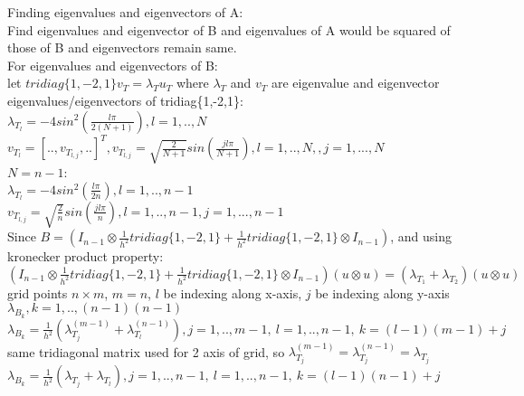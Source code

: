\documentclass[12pt,letter]{article}
\begin{document}
\begin{enumerate}
\begin{enumerate}
    \pagebreak
    
    Finding eigenvalues and eigenvectors of A:\\

    Find eigenvalues and eigenvector of B and eigenvalues of A would be squared of those of B and eigenvectors remain same.\\

    For eigenvalues and eigenvectors of B:\\
    
    let $tridiag\{1,-2,1\} v_T=\lambda_{T} u_T$ where $\lambda_T$ and $v_T$ are eigenvalue and eigenvector\\

    eigenvalues/eigenvectors of tridiag\{1,-2,1\}:\\
    $\lambda_{T_l}=-4sin^2(\frac{l \pi}{2(N+1)}), l=1,..,N$\\
    $v_{T_{l}} = [.., v_{T_{l,j}}, ..]^T, v_{T_{l,j}}=\sqrt{\frac{2}{N+1}}sin(\frac{jl \pi}{N+1}),l=1,..,N,, j=1,...,N$\\

    $N=n-1$:\\
    $\lambda_{T_l}=-4sin^2(\frac{l \pi}{2n}), l=1,..,n-1$\\
    $v_{T_{l,j}}=\sqrt{\frac{2}{n}}sin(\frac{jl \pi}{n}), l=1,..,n-1, j=1,...,n-1$\\
    
    Since $B=(I_{n-1} \otimes \frac{1}{h^2}tridiag\{1,-2,1\} + \frac{1}{h^2}tridiag\{1,-2,1\} \otimes I_{n-1})$, and using kronecker product property:\\
    
    $(I_{n-1} \otimes \frac{1}{h^2}tridiag\{1,-2,1\} + \frac{1}{h^2}tridiag\{1,-2,1\} \otimes I_{n-1})(u \otimes u)= (\lambda_{T_{1}}+\lambda_{T_{2}})(u \otimes u)$\\

    grid points $n \times m$, $m=n$, $l$ be indexing along x-axis, $j$ be indexing along y-axis\\

    $\lambda_{B_k}, k=1,..,(n-1)(n-1)$\\
    $\lambda_{B_k} = \frac{1}{h^2}(\lambda_{T_j}^{(m-1)} + \lambda_{T_l}^{(n-1)}), j=1,..,m-1,\ l=1,..,n-1,\ k=(l-1)(m-1)+j$\\
    same tridiagonal matrix used for 2 axis of grid, so $\lambda_{T_j}^{(m-1)}=\lambda_{T_j}^{(n-1)}=\lambda_{T_j}$\\
    $\lambda_{B_k} = \frac{1}{h^2}(\lambda_{T_j} + \lambda_{T_l}), j=1,..,n-1,\ l=1,..,n-1,\ k=(l-1)(n-1)+j$\\
    

\end{enumerate}
\end{enumerate}
\end{document}
